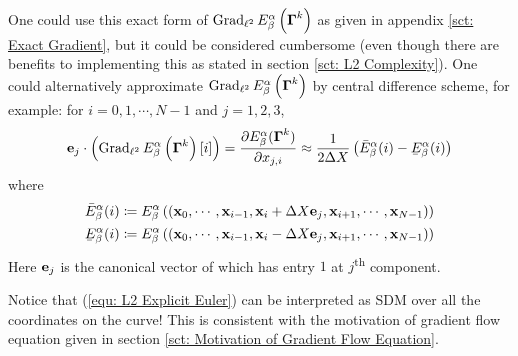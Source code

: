 \documentclass[../dissertation.tex]{subfiles}
\begin{document}
One could use this exact form of $\operatorname{Grad}_{\ell^2} E_{\beta}^{\alpha} \left( \boldsymbol{\Gamma}^k \right)$ as given in appendix \ref{sct: Exact Gradient}, but it could be considered cumbersome (even though there are benefits to implementing this as stated in section \ref{sct: L2 Complexity}).
One could alternatively approximate $\operatorname{Grad}_{\ell^2} E_{\beta}^{\alpha} \left( \boldsymbol{\Gamma}^k \right)$ by central difference scheme, for example:
for $i=0,1,\cdots,N-1$ and $j = 1,2,3$,
\begin{equation}
    \ebf_j \cdot \left( \Grad_{\ell^2} E_{\beta}^{\alpha} \left( \Gammabf^k \right) [i] \right)
    =
    \frac{\partial E_{\beta}^{\alpha} (\Gammabf^k)}{\partial x_{j,i}}
    \approx
    \frac{1}{2 \Delta X} \left( 
        \bar{E}_{\beta}^{\alpha} (i)
        -
        \underaccent{\bar} E_{\beta}^{\alpha} (i)
    \right)
\end{equation}
where
\begin{align*}
    \bar{E}_{\beta}^{\alpha} (i) &\coloneqq E_{\beta}^{\alpha} \left( \left( \xbf_0, \cdots, \xbf_{i-1}, \xbf_i + \Delta X \ebf_{j}, \xbf_{i+1}, \cdots, \xbf_{N-1}\right) \right) \\
    \underaccent{\bar}{E}_{\beta}^{\alpha} (i) &\coloneqq E_{\beta}^{\alpha} \left( \left( \xbf_0, \cdots, \xbf_{i-1}, \xbf_i - \Delta X \ebf_{j}, \xbf_{i+1}, \cdots, \xbf_{N-1}\right) \right)
\end{align*}
Here $\mathbf{e}_j$ is the canonical vector of which has entry $1$ at $j$\textsuperscript{th} component.


\begin{remark}
Notice that (\ref{equ: L2 Explicit Euler}) can be interpreted as SDM over all the coordinates on the curve!
This is consistent with the motivation of gradient flow equation given in section \ref{sct: Motivation of Gradient Flow Equation}.
\end{remark}
\end{document}
